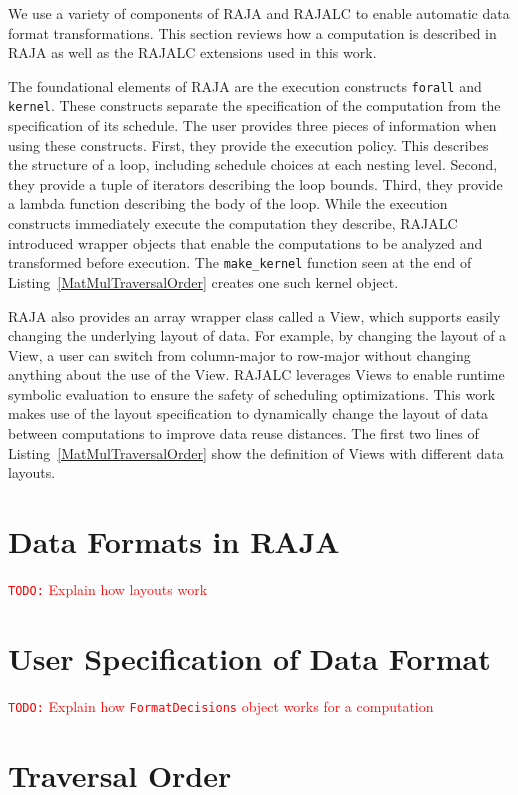 \documentclass[sigconf, table]{acmart}
\newcommand{\todo}[1]{{\textcolor{red}{{\tt{TODO:}}\,\,#1 }}}
\begin{document}
We use a variety of components of RAJA and RAJALC to enable automatic data format transformations. This section reviews how a computation is described in RAJA as well as the RAJALC extensions used in this work. 

The foundational elements of RAJA are the execution constructs \verb.forall. and \verb.kernel.. 
These constructs separate the specification of the computation from the specification of its schedule. 
The user provides three pieces of information when using these constructs. 
First, they provide the execution policy. 
This describes the structure of a loop, including schedule choices at each nesting level. 
Second, they provide a tuple of iterators describing the loop bounds. 
Third, they provide a lambda function describing the body of the loop.
While the execution constructs immediately execute the computation they describe, RAJALC introduced wrapper objects that enable the computations to be analyzed and transformed before execution. 
The \verb.make_kernel. function seen at the end of Listing~\ref{MatMulTraversalOrder} creates one such kernel object.

RAJA also provides an array wrapper class called a View, which supports easily changing the underlying layout of data. 
For example, by changing the layout of a View, a user can switch from column-major to row-major without changing anything about the use of the View. 
RAJALC leverages Views to enable runtime symbolic evaluation to ensure the safety of scheduling optimizations. 
This work makes use of the layout specification to dynamically change the layout of data between computations to improve data reuse distances.
The first two lines of Listing~\ref{MatMulTraversalOrder} show the definition of Views with different data layouts. 

\section{Data Formats in RAJA}

\todo{Explain how layouts work}

\section{User Specification of Data Format}

\todo{Explain how \texttt{FormatDecisions} object works for a computation}

\section{Traversal Order}
\end{document}
